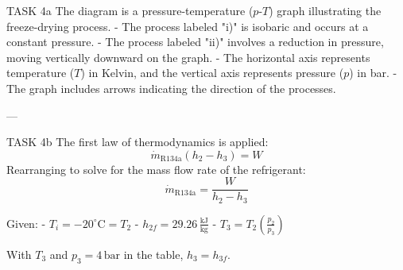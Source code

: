 TASK 4a  
The diagram is a pressure-temperature (\(p\)-\(T\)) graph illustrating the freeze-drying process.  
- The process labeled "i)" is isobaric and occurs at a constant pressure.  
- The process labeled "ii)" involves a reduction in pressure, moving vertically downward on the graph.  
- The horizontal axis represents temperature (\(T\)) in Kelvin, and the vertical axis represents pressure (\(p\)) in bar.  
- The graph includes arrows indicating the direction of the processes.

---

TASK 4b  
The first law of thermodynamics is applied:  
\[
\dot{m}_{\text{R134a}} (h_2 - h_3) = W
\]
Rearranging to solve for the mass flow rate of the refrigerant:  
\[
\dot{m}_{\text{R134a}} = \frac{W}{h_2 - h_3}
\]

Given:  
- \(T_i = -20^\circ\text{C} = T_2\)  
- \(h_{2f} = 29.26 \, \frac{\text{kJ}}{\text{kg}}\)  
- \(T_3 = T_2 \left(\frac{p_2}{p_3}\right)\)  

With \(T_3\) and \(p_3 = 4 \, \text{bar}\) in the table, \(h_3 = h_{3f}\).